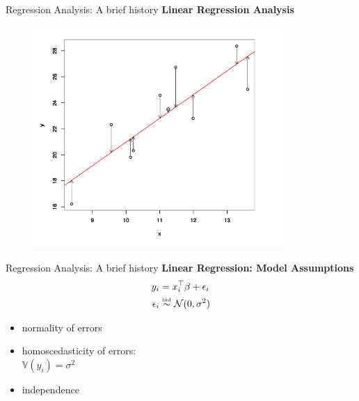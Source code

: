 \documentclass[t]{beamer} 	%
\newcommand{\Var}{\mathbb{V}}
\begin{document}
\begin{frame}{Regression Analysis: A brief history}
	\textbf{Linear Regression Analysis}
	\begin{figure}
		\centering
	\includegraphics[width=0.85\textwidth]{images/least_squares}
	\end{figure}
\end{frame}

\begin{frame}{Regression Analysis: A brief history}
	\textbf{Linear Regression: Model Assumptions}
	\begin{align*}
		y_i &= x_i^\top\beta+\epsilon_i \\
		\epsilon_i&\stackrel{\hbox{\tiny{ind}}}{\sim} \mathcal{N}(0,\sigma^2)
	\end{align*}
	\begin{itemize}
	\item normality of errors
	\item homoscedasticity of errors: \\
	$\Var(y_i)=\sigma^2$
	\item independence
	\end{itemize}
\end{frame}
\end{document}
